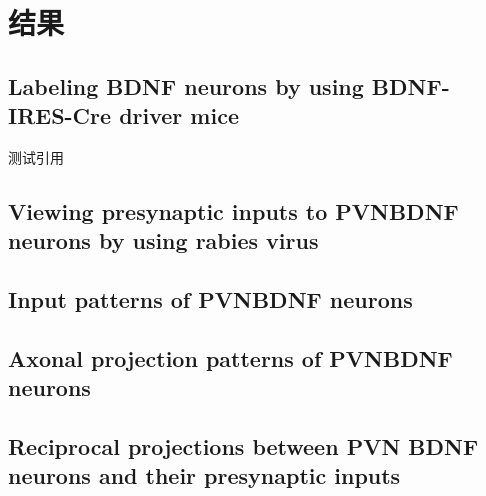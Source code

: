 \chapter{结果}\label{chap:results}

\section{Labeling BDNF neurons by using BDNF-IRES-Cre driver mice}
测试引用\citep{zhang2017whole,wickersham2007monosynaptic,huang1974differential}
\section{Viewing presynaptic inputs to PVNBDNF neurons by using rabies virus}

\section{Input patterns of PVNBDNF neurons}

\section{Axonal projection patterns of PVNBDNF neurons}

\section{Reciprocal projections between PVN BDNF neurons and their presynaptic inputs}